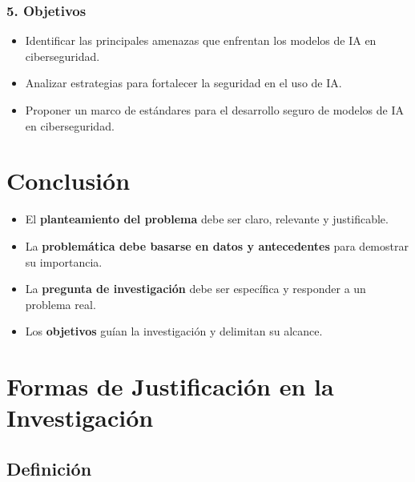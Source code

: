 \documentclass[
  letterpaper,
  DIV=11,
  numbers=noendperiod]{scrartcl}
\providecommand{\tightlist}{%
  \setlength{\itemsep}{0pt}\setlength{\parskip}{0pt}}
\begin{document}
\subsubsection{\texorpdfstring{\textbf{5.
Objetivos}}{5. Objetivos}}\label{objetivos-3}

\begin{itemize}
\tightlist
\item
  Identificar las principales amenazas que enfrentan los modelos de IA
  en ciberseguridad.\\
\item
  Analizar estrategias para fortalecer la seguridad en el uso de IA.\\
\item
  Proponer un marco de estándares para el desarrollo seguro de modelos
  de IA en ciberseguridad.
\end{itemize}

\section{Conclusión}\label{conclusiuxf3n}

\begin{itemize}
\tightlist
\item
  El \textbf{planteamiento del problema} debe ser claro, relevante y
  justificable.\\
\item
  La \textbf{problemática debe basarse en datos y antecedentes} para
  demostrar su importancia.\\
\item
  La \textbf{pregunta de investigación} debe ser específica y responder
  a un problema real.\\
\item
  Los \textbf{objetivos} guían la investigación y delimitan su alcance.
\end{itemize}

\section{\texorpdfstring{\textbf{Formas de Justificación en la
Investigación}}{Formas de Justificación en la Investigación}}\label{formas-de-justificaciuxf3n-en-la-investigaciuxf3n}

\subsection{\texorpdfstring{\textbf{Definición}}{Definición}}\label{definiciuxf3n}
\end{document}
